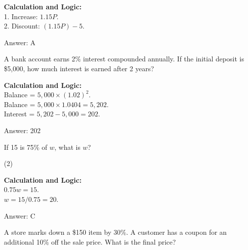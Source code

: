 \documentclass[11pt,paper=a4,answers]{exam}
\begin{document}
\begin{questions}
\begin{solution}
\textbf{Calculation and Logic:} \\
1. Increase: $1.15P$. \\
2. Discount: $(1.15P) - 5$.

\vspace{30pt}

Answer: \colorbox{yellow!100}{A}
\end{solution}

\vspace{60pt}

\question
A bank account earns 2\% interest compounded annually. If the initial deposit is \$5,000, how much interest is earned after 2 years?

\begin{solution}
\textbf{Calculation and Logic:} \\
Balance = $5,000 \times (1.02)^2$. \\
Balance = $5,000 \times 1.0404 = 5,202$. \\
Interest = $5,202 - 5,000 = 202$.

\vspace{30pt}

Answer: \colorbox{yellow!100}{202}
\end{solution}

\vspace{60pt}

\question
If 15 is 75\% of $w$, what is $w$?
\begin{tasks}(2)
\end{tasks}

\begin{solution}
\textbf{Calculation and Logic:} \\
$0.75w = 15$. \\
$w = 15 / 0.75 = 20$.

\vspace{30pt}

Answer: \colorbox{yellow!100}{C}
\end{solution}

\vspace{60pt}

\question
A store marks down a \$150 item by 30\%. A customer has a coupon for an additional 10\% off the sale price. What is the final price?


\end{questions}
\end{document}
